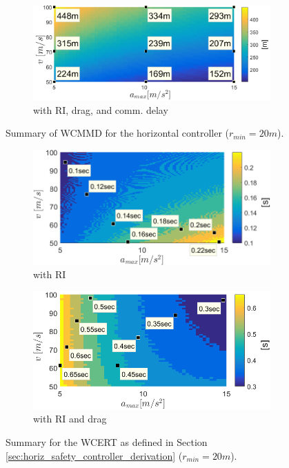 \documentclass[journal,11pt,onecolumn,draftclsnofoot,]{IEEEtran}
\begin{document}
\begin{figure}
	\hfill
	\begin{subfigure}{.45\columnwidth}\centering
		\includegraphics[width=\columnwidth]{WCMMD_horizontal_RI_drag_delay}
		\caption{with RI, drag, and comm. delay}
		\label{fig:WCMMD_horiz_RI_drag_delay}
	\end{subfigure}%
	\caption{Summary of WCMMD for the horizontal controller ($r_{min}=20m$).}
\end{figure}

\begin{figure}
	\centering
	\begin{subfigure}{.48\columnwidth}
		\centering
		\includegraphics[width=\columnwidth]{WCERT_horizontal_RI}
		\caption{with RI}
		\label{fig:WCERT_horiz_RI}
	\end{subfigure}
	\hfill
	\begin{subfigure}{.48\columnwidth}
		\centering
		\includegraphics[width=\columnwidth]{WCERT_horizontal_RI_drag}
		\caption{with RI and drag}
		\label{fig:WCERT_horiz_RI_drag}
	\end{subfigure}
	\caption{Summary for the
		WCERT as defined in Section \ref{sec:horiz_safety_controller_derivation} ($r_{min}=20m$).}
	\label{fig:WCERT_horiz}
\end{figure}
\end{document}
